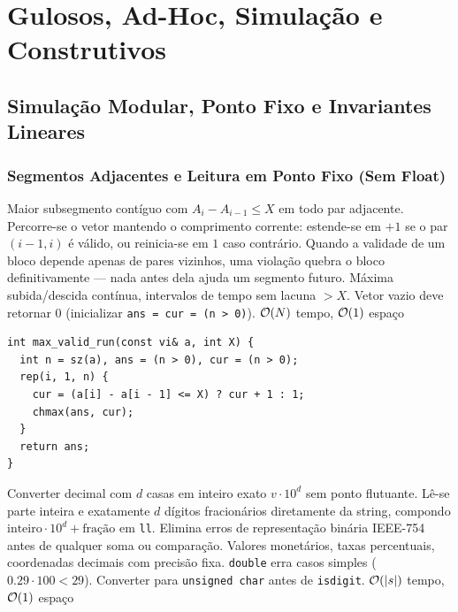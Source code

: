 \section{Gulosos, Ad-Hoc, Simulação e Construtivos}

\subsection{Simulação Modular, Ponto Fixo e Invariantes Lineares}

\subsubsection{Segmentos Adjacentes e Leitura em Ponto Fixo (Sem Float)}
\algobox
  {Maior subsegmento contíguo com $A_i - A_{i-1} \le X$ em todo par adjacente.}
  {Percorre-se o vetor mantendo o comprimento corrente: estende-se em $+1$ se o par $(i-1, i)$ é válido, ou reinicia-se em $1$ caso contrário.}
  {Quando a validade de um bloco depende apenas de pares vizinhos, uma violação quebra o bloco definitivamente — nada antes dela ajuda um segmento futuro.}
  {Máxima subida/descida contínua, intervalos de tempo sem lacuna $> X$.}
  {Vetor vazio deve retornar $0$ (inicializar \texttt{ans = cur = (n > 0)}).}
  {$\mathcal{O}(N)$ tempo, $\mathcal{O}(1)$ espaço}

\begin{lstlisting}
int max_valid_run(const vi& a, int X) {
  int n = sz(a), ans = (n > 0), cur = (n > 0);
  rep(i, 1, n) {
    cur = (a[i] - a[i - 1] <= X) ? cur + 1 : 1;
    chmax(ans, cur);
  }
  return ans;
}
\end{lstlisting}

\algobox
  {Converter decimal com $d$ casas em inteiro exato $v \cdot 10^d$ sem ponto flutuante.}
  {Lê-se parte inteira e exatamente $d$ dígitos fracionários diretamente da string, compondo $\text{inteiro} \cdot 10^d + \text{fração}$ em \texttt{ll}.}
  {Elimina erros de representação binária IEEE-754 antes de qualquer soma ou comparação.}
  {Valores monetários, taxas percentuais, coordenadas decimais com precisão fixa.}
  {\texttt{double} erra casos simples ($0.29 \cdot 100 < 29$). Converter para \texttt{unsigned char} antes de \texttt{isdigit}.}
  {$\mathcal{O}(|s|)$ tempo, $\mathcal{O}(1)$ espaço}

